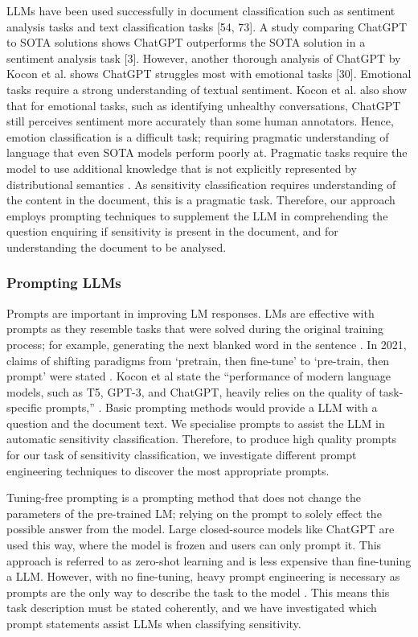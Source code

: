 LLMs have been used successfully in document classification such as sentiment analysis tasks \cite{gao2020making, qin2023chatgpt, amin2023will} and text classification tasks [54, 73]. A study comparing ChatGPT to SOTA solutions shows ChatGPT outperforms the SOTA solution in a sentiment analysis task [3]. However, another thorough analysis of ChatGPT by Kocon et al. shows ChatGPT struggles most with emotional tasks [30]. Emotional tasks require a strong understanding of textual sentiment. Kocon et al. also show that for emotional tasks, such as identifying unhealthy conversations, ChatGPT still perceives sentiment more accurately than some human annotators. Hence, emotion classification is a difficult task; requiring pragmatic understanding of language that even SOTA models perform poorly at. Pragmatic tasks require the model to use additional knowledge that is not explicitly represented by distributional semantics \cite{kocon2023chatgpt}. As sensitivity classification requires understanding of the content in the document, this is a pragmatic task. Therefore, our approach employs prompting techniques to supplement the LLM in comprehending the question enquiring if sensitivity is present in the document, and for understanding the document to be analysed.

\subsubsection{Prompting LLMs}
Prompts are important in improving LM responses. LMs are effective with prompts as they resemble tasks that were solved during the original training process; for example, generating the next blanked word in the sentence \cite{liu2023pre}. In 2021, claims of shifting paradigms from ‘pretrain, then fine-tune’ to ‘pre-train, then prompt’ were stated \cite{liu2023pre}. Kocon et al state the “performance of modern language models, such as T5, GPT-3, and ChatGPT, heavily relies on the quality of task-specific prompts,” \cite{kocon2023chatgpt}. Basic prompting methods would provide a LLM with a question and the document text. We specialise prompts to assist the LLM in automatic sensitivity classification. Therefore, to produce high quality prompts for our task of sensitivity classification, we investigate different prompt engineering techniques to discover the most appropriate prompts.

Tuning-free prompting is a prompting method that does not change the parameters of the pre-trained LM; relying on the prompt to solely effect the possible answer from the model. Large closed-source models like ChatGPT \cite{brown2020language} are used this way, where the model is frozen and users can only prompt it. This approach is referred to as zero-shot learning and is less expensive than fine-tuning a LLM. However, with no fine-tuning, heavy prompt engineering is necessary as prompts are the only way to describe the task to the model \cite{liu2023pre}. This means this task description must be stated coherently, and we have investigated which prompt statements assist LLMs when classifying sensitivity.

